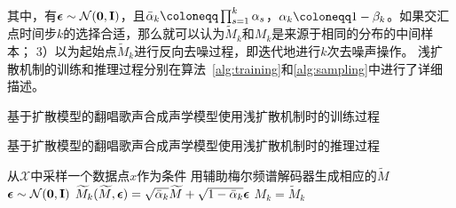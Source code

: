 其中，有${\boldsymbol{\epsilon}}\sim\mathcal{N}(\mathbf{0}, \mathbf{I})$，且$\bar\alpha_k \defeq \prod_{s=1}^k \alpha_s$，$\alpha_k \defeq 1-\beta_k$。如果交汇点时间步$k$的选择合适，那么就可以认为$\widetilde{M}_k$和$M_k$是来源于相同的分布的中间样本；
3）以为起始点$\widetilde{M}_k$进行反向去噪过程，即迭代地进行$k$次去噪声操作。
浅扩散机制的训练和推理过程分别在算法~\ref{alg:training}和\ref{alg:sampling}中进行了详细描述。
\begin{algorithm}[!h]
\caption{基于扩散模型的翻唱歌声合成声学模型使用浅扩散机制时的训练过程}
\label{alg:training}
\end{algorithm}
\begin{algorithm}[!h]
\caption{基于扩散模型的翻唱歌声合成声学模型使用浅扩散机制时的推理过程}
\label{alg:sampling}
    从$\mathcal{X}$中采样一个数据点$x$作为条件\;
    用辅助梅尔频谱解码器生成相应的$\widetilde{M}$\;
    ${\boldsymbol{\epsilon}}\sim\mathcal{N}(\mathbf{0},\mathbf{I})$\;
    $\widetilde{M}_k(\widetilde{M}, {\boldsymbol{\epsilon}}) = \sqrt{\bar\alpha_k}\widetilde{M} + \sqrt{1-\bar\alpha_k}{\boldsymbol{\epsilon}}$\;
    $M_k =  \widetilde{M}_k$\;
\end{algorithm}
